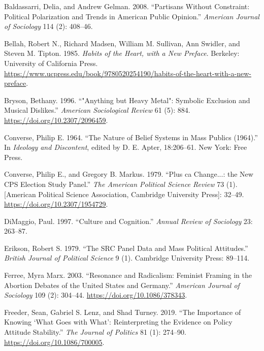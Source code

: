 \documentclass[12pt,]{article}
\begin{document}
\leavevmode\hypertarget{ref-baldassarri2008}{}%
Baldassarri, Delia, and Andrew Gelman. 2008. ``Partisans Without Constraint: Political Polarization and Trends in American Public Opinion.'' \emph{American Journal of Sociology} 114 (2): 408--46.

\leavevmode\hypertarget{ref-bellah1985}{}%
Bellah, Robert N., Richard Madsen, William M. Sullivan, Ann Swidler, and Steven M. Tipton. 1985. \emph{Habits of the Heart, with a New Preface}. Berkeley: University of California Press. \url{https://www.ucpress.edu/book/9780520254190/habits-of-the-heart-with-a-new-preface}.

\leavevmode\hypertarget{ref-bryson1996}{}%
Bryson, Bethany. 1996. ``"Anything but Heavy Metal": Symbolic Exclusion and Musical Dislikes.'' \emph{American Sociological Review} 61 (5): 884. \url{https://doi.org/10.2307/2096459}.

\leavevmode\hypertarget{ref-converse1964}{}%
Converse, Philip E. 1964. ``The Nature of Belief Systems in Mass Publics (1964).'' In \emph{Ideology and Discontent}, edited by D. E. Apter, 18:206--61. New York: Free Press.

\leavevmode\hypertarget{ref-converse1979}{}%
Converse, Philip E., and Gregory B. Markus. 1979. ``Plus ca Change...: the New CPS Election Study Panel.'' \emph{The American Political Science Review} 73 (1). {[}American Political Science Association, Cambridge University Press{]}: 32--49. \url{https://doi.org/10.2307/1954729}.

\leavevmode\hypertarget{ref-dimaggio1997}{}%
DiMaggio, Paul. 1997. ``Culture and Cognition.'' \emph{Annual Review of Sociology} 23: 263--87.

\leavevmode\hypertarget{ref-erikson1979}{}%
Erikson, Robert S. 1979. ``The SRC Panel Data and Mass Political Attitudes.'' \emph{British Journal of Political Science} 9 (1). Cambridge University Press: 89--114.

\leavevmode\hypertarget{ref-ferree2003}{}%
Ferree, Myra Marx. 2003. ``Resonance and Radicalism: Feminist Framing in the Abortion Debates of the United States and Germany.'' \emph{American Journal of Sociology} 109 (2): 304--44. \url{https://doi.org/10.1086/378343}.

\leavevmode\hypertarget{ref-freeder2019}{}%
Freeder, Sean, Gabriel S. Lenz, and Shad Turney. 2019. ``The Importance of Knowing `What Goes with What': Reinterpreting the Evidence on Policy Attitude Stability.'' \emph{The Journal of Politics} 81 (1): 274--90. \url{https://doi.org/10.1086/700005}.
\end{document}
